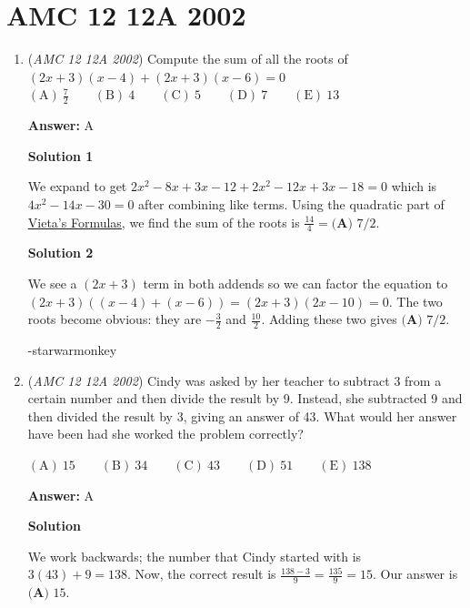 \section{AMC 12 12A 2002}
        \begin{enumerate}
        	\item (\textit{AMC 12 12A 2002}) Compute the sum of all the roots of
$(2x+3)(x-4)+(2x+3)(x-6)=0$
$\mathrm{(A) \ } \frac{7}{2}\qquad \mathrm{(B) \ } 4\qquad \mathrm{(C) \ } 5\qquad \mathrm{(D) \ } 7\qquad \mathrm{(E) \ } 13$

 \textbf{Answer: }A



\textbf{Solution 1}

We expand to get $2x^2-8x+3x-12+2x^2-12x+3x-18=0$ which is $4x^2-14x-30=0$ after combining like terms. Using the quadratic part of \href{https://artofproblemsolving.com/wiki/index.php?title=Vieta\%27s\_Formulas}{Vieta's Formulas}, we find the sum of the roots is $\frac{14}4 = \boxed{\textbf{(A) }7/2}$.

 



\textbf{Solution 2}

We see a $(2x+3)$ term in both addends so we can factor the equation to $(2x+3)((x-4)+(x-6))=(2x+3)(2x-10)=0.$ The two roots become obvious: they are $-\frac{3}{2}$ and $\frac{10}{2}.$ Adding these two gives $\boxed{\textbf{(A) }7/2}.$

 -starwarmonkey

 


	\item (\textit{AMC 12 12A 2002}) Cindy was asked by her teacher to subtract 3 from a certain number and then divide the result by 9. Instead, she subtracted 9 and then divided the result by 3, giving an answer of 43. What would her answer have been had she worked the problem correctly?


 $\mathrm{(A) \ } 15\qquad \mathrm{(B) \ } 34\qquad \mathrm{(C) \ } 43\qquad \mathrm{(D) \ } 51\qquad \mathrm{(E) \ } 138$

 \textbf{Answer: }A



\textbf{Solution}

We work backwards; the number that Cindy started with is $3(43)+9=138$. Now, the correct result is $\frac{138-3}{9}=\frac{135}{9}=15$. Our answer is $\boxed{\textbf{(A) }15}$.

 


 




\end{enumerate}
